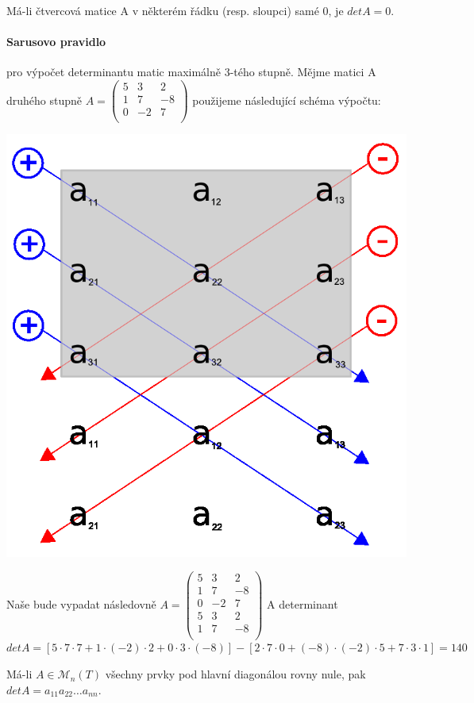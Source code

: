 \begin{sentence}
	Má-li čtvercová matice A v některém řádku (resp. sloupci) samé 0, je $detA = 0$.
\end{sentence}

\paragraph{Sarusovo pravidlo} pro výpočet determinantu matic maximálně 3-tého stupně. Mějme matici A druhého stupně $A = \left( \begin{array}{ccc} 5 & 3 & 2\\ 1 & 7 & -8\\ 0 & -2 & 7\\ \end{array} \right)$ použijeme následující schéma výpočtu: 
\begin{center}
	\includegraphics[scale=0.2]{img/SarussRule}
\end{center}
Naše  bude vypadat následovně $A = \left( \begin{array}{ccc} 5 & 3 & 2\\ 1 & 7 & -8\\ 0 & -2 & 7\\ 5 & 3 & 2\\ 1 & 7 & -8\\ \end{array} \right)$ A determinant $detA = [5⋅7⋅7+1⋅(−2)⋅2+0⋅3⋅(−8)]−[2⋅7⋅0+(−8)⋅(−2)⋅5+7⋅3⋅1]=140$
\begin{sentence}
	Má-li $A \in \mathscr{M}_n(T)$ všechny prvky pod hlavní diagonálou rovny nule, pak $detA = a_{11}a_{22}\dots a_{nn}$. 
\end{sentence}

